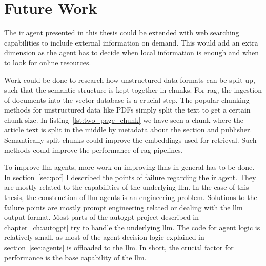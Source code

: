 \documentclass[../main.tex]{subfiles}
\begin{document}
\section{Future Work}

The \gls{ir} agent presented in this thesis could be extended with web searching capabilities
to include external information on demand.
This would add an extra dimension as the agent has to decide when local information
is enough and when to look for online resources.

Work could be done to research how unstructured data formats can be split up,
such that the semantic structure is kept together in chunks.
For \gls{rag}, the ingestion of documents into the vector database is a crucial step.
The popular chunking methods for unstructured data like PDFs simply split the text to get a certain chunk size.
In listing~\ref{lst:two_page_chunk} we have seen a chunk where the article text is split in the middle
by metadata about the section and publisher.
Semantically split chunks could improve the embeddings used for retrieval.
Such methods could improve the performance of \gls{rag} pipelines.

To improve \gls{llm} agents, more work on improving \glspl{llm} in
general has to be done.
In section~\ref{sec:pof} I described the points of failure regarding the \gls{ir} agent.
They are mostly related to the capabilities of the underlying \gls{llm}.
In the case of this thesis,
the construction of \gls{llm} agents is an engineering problem.
Solutions to the failure points are mostly prompt
engineering related or dealing with the \gls{llm} output format.
Most parts of the \gls{autogpt} project described in chapter~\ref{ch:autogpt} try
to handle the underlying \gls{llm}.
The code for agent logic is relatively small, as most of the agent decision logic
explained in section~\ref{sec:agents} is offloaded to the \gls{llm}.
In short, the crucial factor for performance is the base capability of the \gls{llm}.
\end{document}
